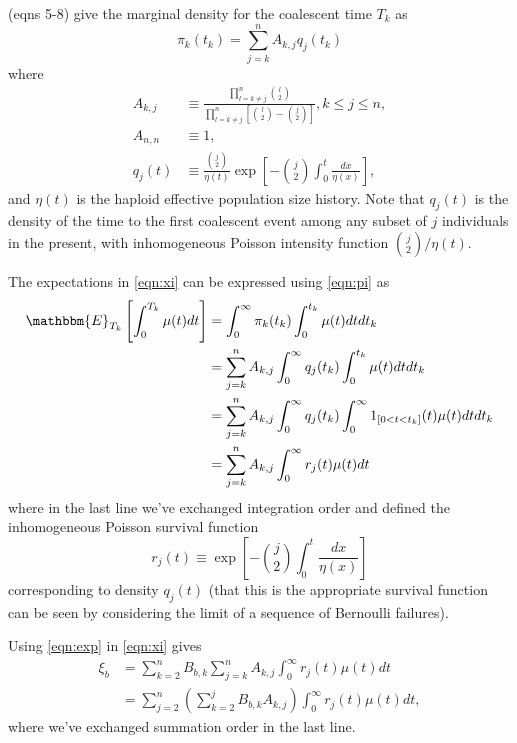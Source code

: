\documentclass[11pt]{article}
\begin{document}
\cite{Polanski2003-kg} (eqns 5-8) give the marginal density for the coalescent time $T_k$ as
\begin{equation}
\label{eqn:pi}
\pi_k(t_k) = \sum_{j=k}^n A_{k,j} q_j(t_k)
\end{equation}
where
\begin{align*}
A_{k,j} &\equiv \frac{\prod_{l=k\ne j}^{n}\binom{l}{2}}{\prod_{l=k\ne j}^{n}\left[\binom{l}{2}-\binom{j}{2}\right]}, k\le j\le n,\\
A_{n,n} &\equiv 1,\\
q_j(t) &\equiv \frac{\binom{j}{2}}{\eta(t)}\exp\left[-\binom{j}{2}\int_0^t\frac{dx}{\eta(x)}\right],
\end{align*}
and $\eta(t)$ is the haploid effective population size history.
Note that $q_j(t)$ is the density of the time to the first coalescent event among any subset of $j$ individuals in the present, with inhomogeneous Poisson intensity function $\binom{j}{2}/\eta(t)$.

The expectations in \eqref{eqn:xi} can be expressed using \eqref{eqn:pi} as
\begin{align}
\label{eqn:exp}
\mathbbm{E}_{T_k}\left[\int_0^{T_k}\mu(t)dt\right] &= \int_0^\infty\pi_k(t_k)\int_0^{t_k}\mu(t)dt dt_k\nonumber\\
&= \sum_{j=k}^n A_{k,j}\int_0^\infty q_j(t_k)\int_0^{t_k}\mu(t)dt dt_k\nonumber\\
&= \sum_{j=k}^n A_{k,j}\int_0^\infty q_j(t_k)\int_0^\infty 1_{[0<t<t_k]}(t)\mu(t)dt dt_k\nonumber\\
&= \sum_{j=k}^n A_{k,j}\int_0^\infty r_j(t)\mu(t)dt
\end{align}
where in the last line we've exchanged integration order and defined the inhomogeneous Poisson survival function
\begin{equation}
\label{eqn:r}
r_j(t) \equiv \exp\left[-\binom{j}{2}\int_0^t\frac{dx}{\eta(x)}\right]
\end{equation}
corresponding to density $q_j(t)$ (that this is the appropriate survival function can be seen by considering the limit of a sequence of Bernoulli failures).

Using \eqref{eqn:exp} in \eqref{eqn:xi} gives
\begin{align}
\label{eqn:xi2}
\xi_b &= \sum_{k=2}^n B_{b,k} \sum_{j=k}^n A_{k,j}\int_0^\infty r_j(t)\mu(t)dt\nonumber\\
&= \sum_{j=2}^n \left(\sum_{k=2}^j B_{b,k} A_{k,j}\right) \int_0^\infty r_j(t)\mu(t)dt,
\end{align}
where we've exchanged summation order in the last line.
\end{document}
